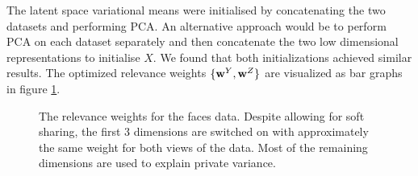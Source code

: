 \par The latent space variational means were initialised by
concatenating the two datasets and performing PCA. An alternative
approach would be to perform PCA on each dataset separately and then
concatenate the two low dimensional representations to initialise $X$.
We found that both initializations achieved similar results. 
The optimized relevance weights $\{\mathbf{w}^Y, \mathbf{w}^Z\}$
are
visualized as bar graphs in figure \ref{fig:yale6SetsScales}.

\begin{figure}[ht]
\begin{center}
\end{center}
\vspace{-5pt}
\caption{
The relevance  weights for the faces data. Despite allowing for soft sharing, the first 3 dimensions are switched on with approximately the same weight for both views of the data. Most of the remaining dimensions are used to explain private variance. %
}
\label{fig:yale6SetsScales}
\end{figure}

